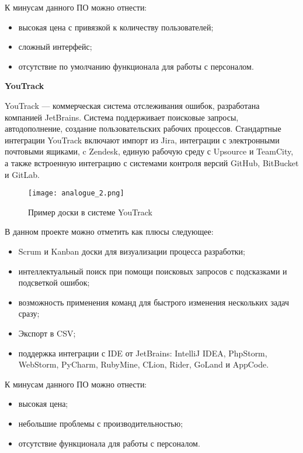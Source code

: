 К минусам данного ПО можно отнести:
\begin{itemize}
    \item высокая цена с привязкой к количеству пользователей;
    \item сложный интерфейс;
    \item отсутствие по умолчанию функционала для работы с персоналом.
\end{itemize}

\textbf{YouTrack}

YouTrack — коммерческая система отслеживания ошибок, разработана компанией JetBrains. Система поддерживает поисковые запросы, автодополнение, создание пользовательских рабочих процессов. Стандартные интеграции YouTrack включают импорт из Jira, интеграции с электронными почтовыми ящиками, c Zendesk, единую рабочую среду с Upsource и TeamCity, а также встроенную интеграцию с системами контроля версий GitHub, BitBucket и GitLab.

\begin{figure}[ht]
    \centering
	\texttt{[image: analogue\_2.png]}
	\caption{Пример доски в системе YouTrack}\label{fig:analysis:analogue_2:picture}
\end{figure}

В данном проекте можно отметить как плюсы следующее:
\begin{itemize}
    \item Scrum и Kanban доски для визуализации процесса разработки;
    \item интеллектуальный поиск при помощи поисковых запросов с подсказками и подсветкой ошибок;
    \item возможность применения команд для быстрого изменения нескольких задач сразу;
    \item Экспорт в CSV;
    \item поддержка интеграции с IDE от JetBrains: IntelliJ IDEA, PhpStorm, WebStorm, PyCharm, RubyMine, CLion, Rider, GoLand и AppCode.
\end{itemize}

К минусам данного ПО можно отнести:
\begin{itemize}
    \item высокая цена;
    \item небольшие проблемы с производительностью;
    \item отсутствие функционала для работы с персоналом.
\end{itemize}

